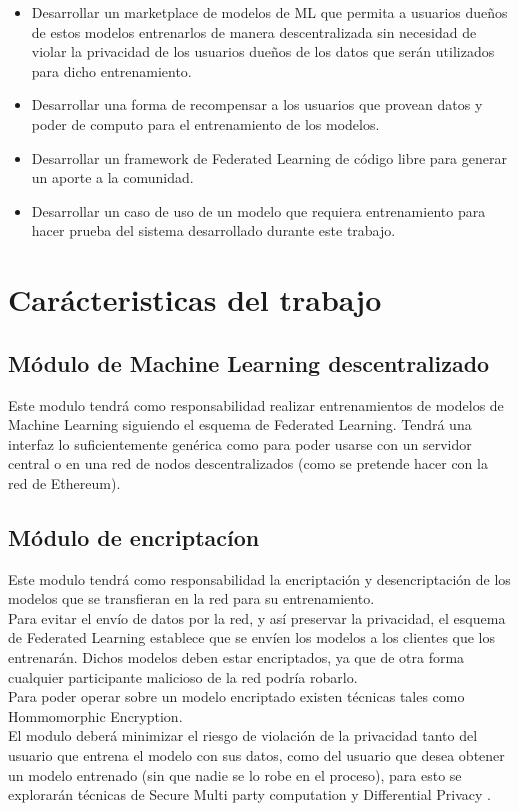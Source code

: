 \documentclass[
11pt, %
oneside, %
spanish, %
singlespacing, %
headsepline, %
chapterinoneline, %
]{MastersDoctoralThesis} %
\begin{document}
\begin{itemize}
\item Desarrollar un marketplace de modelos de ML que permita a usuarios dueños de estos modelos entrenarlos de manera descentralizada sin necesidad de violar la privacidad de los usuarios dueños de los datos que serán utilizados para dicho entrenamiento.  
\item Desarrollar una forma de recompensar a los usuarios que provean datos y poder de computo para el entrenamiento de los modelos.
\item Desarrollar un framework de Federated Learning de código libre para generar un aporte a la comunidad.
\item Desarrollar un caso de uso de un modelo que requiera entrenamiento para hacer prueba del sistema desarrollado durante este trabajo.
\end{itemize}


\chapter{Car\'acteristicas del trabajo}

\section{Módulo de Machine Learning descentralizado}
Este modulo tendrá como responsabilidad realizar entrenamientos de modelos de Machine Learning siguiendo el esquema de Federated Learning. Tendrá una interfaz lo suficientemente genérica como para poder usarse con un servidor central o en una red de nodos descentralizados (como se pretende hacer con la red de Ethereum).

\section{Módulo de encriptac\'ion}
Este modulo tendrá como responsabilidad la encriptación y desencriptación de los modelos que se transfieran en la red para su entrenamiento. \\
Para evitar el envío de datos por la red, y así preservar la privacidad, el esquema de Federated Learning establece que se envíen los modelos a los clientes que los entrenarán.
Dichos modelos deben estar encriptados, ya que de otra forma cualquier participante malicioso de la red podría robarlo. \\
Para poder operar sobre un modelo encriptado existen técnicas tales como Hommomorphic Encryption. \\
El modulo deberá minimizar el riesgo de violación de la privacidad tanto del usuario que entrena el modelo con sus datos, como del usuario que desea obtener un modelo entrenado (sin que nadie se lo robe en el proceso), para esto se explorarán técnicas de  Secure Multi party computation y Differential Privacy \cite{diffpriv1} \cite{diffpriv2}.
\end{document}
